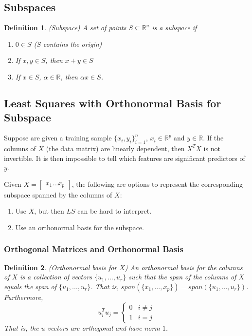 \documentclass[12pt]{article}
\newtheorem{definition}{Definition}
\theoremstyle{definition}
\newcommand{\R}{\mathbb{R}}
\begin{document}
\subsection{Subspaces}
\begin{definition}(Subspace)
A set of points $S \subseteq \R^n$ is a subspace if
\begin{enumerate}
	\item $0 \in S$ ($S$ contains the origin)
	\item If $x,y \in S$, then $x + y \in S$
	\item If $x \in S$, $\alpha \in \R$, then $\alpha x \in S$.
\end{enumerate}
\end{definition}

\subsection{Least Squares with Orthonormal Basis for Subspace}
Suppose are given a training sample $\{x_i, y_i \}_{i=1}^n$, $x_i \in \R^p$ and $y\in \R$. If the columns of $X$ (the data matrix) are linearly dependent, then $X^TX$ is not invertible. It is then impossible to tell which features are significant predictors of $y$. 

Given $X = \begin{bmatrix} x_1 \ldots x_p \end{bmatrix}$, the following are options to represent the corresponding subspace spanned by the columns of $X$: 
\begin{enumerate}
	\item  Use $X$, but then $LS$ can be hard to interpret.
	\item Use an orthonormal basis for the subspace.
\end{enumerate}

\subsubsection{Orthogonal Matrices and Orthonormal Basis}

\begin{definition}(Orthonormal basis for $X$)
An orthonormal basis for the columns of $X$ is a collection of vectors $\{u_1, \ldots, u_r \}$ such that the span of the columns of $X$ equals the span of $\{u_1, \ldots, u_r \}$. That is, $span(\{x_1, \ldots, x_p\}) = span(\{u_1, \ldots, u_r \})$. Furthermore, 
\begin{equation}
	u_i^T u_j = 
	\begin{cases}
	0 & i\neq j \\
	1 & i = j
	\end{cases}
\end{equation}
That is, the $u$ vectors are orthogonal and have norm $1$. 
\end{definition}
\end{document}
